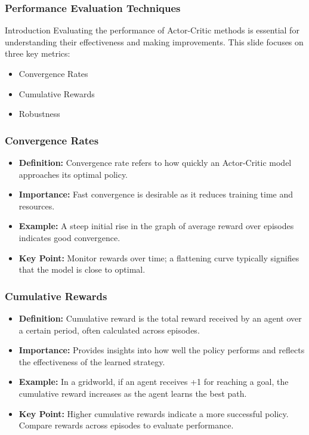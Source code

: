 \documentclass{beamer}
\begin{document}
\begin{frame}[fragile]
    \frametitle{Performance Evaluation Techniques}
    \begin{block}{Introduction}
        Evaluating the performance of Actor-Critic methods is essential for understanding their effectiveness and making improvements. This slide focuses on three key metrics:
        \begin{itemize}
            \item Convergence Rates
            \item Cumulative Rewards
            \item Robustness
        \end{itemize}
    \end{block}
\end{frame}

\begin{frame}[fragile]
    \frametitle{Convergence Rates}
    \begin{itemize}
        \item \textbf{Definition:} Convergence rate refers to how quickly an Actor-Critic model approaches its optimal policy.
        \item \textbf{Importance:} Fast convergence is desirable as it reduces training time and resources.
        \item \textbf{Example:} A steep initial rise in the graph of average reward over episodes indicates good convergence.
        \item \textbf{Key Point:} Monitor rewards over time; a flattening curve typically signifies that the model is close to optimal.
    \end{itemize}
\end{frame}

\begin{frame}[fragile]
    \frametitle{Cumulative Rewards}
    \begin{itemize}
        \item \textbf{Definition:} Cumulative reward is the total reward received by an agent over a certain period, often calculated across episodes.
        \item \textbf{Importance:} Provides insights into how well the policy performs and reflects the effectiveness of the learned strategy.
        \item \textbf{Example:} In a gridworld, if an agent receives +1 for reaching a goal, the cumulative reward increases as the agent learns the best path.
        \item \textbf{Key Point:} Higher cumulative rewards indicate a more successful policy. Compare rewards across episodes to evaluate performance.
    \end{itemize}
\end{frame}
\end{document}
